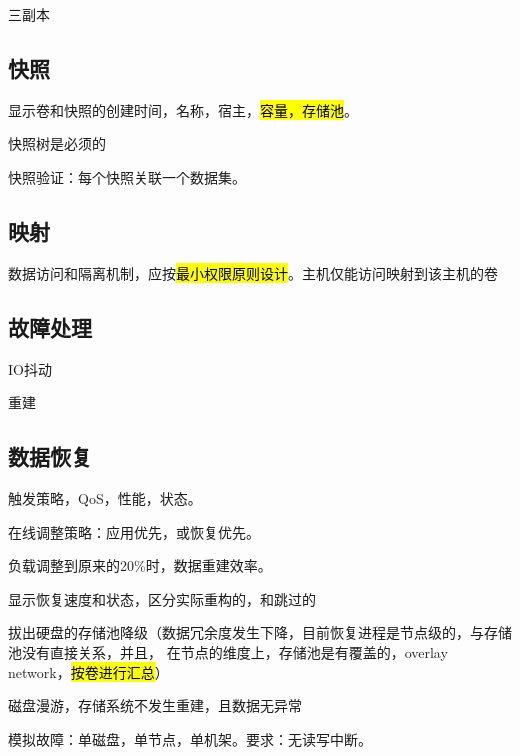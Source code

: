 三副本 

\subsection{快照}

\begin{enumbox}
    \item 显示卷和快照的创建时间，名称，宿主，\hl{容量，存储池}。
    \item 快照树是必须的
    \item 快照验证：每个快照关联一个数据集。
\end{enumbox}

\subsection{映射}

数据访问和隔离机制，应按\hl{最小权限原则设计}。主机仅能访问映射到该主机的卷

\subsection{故障处理}

\begin{enumbox}
    \item IO抖动
    \item 重建
\end{enumbox}

\subsection{数据恢复}

触发策略，QoS，性能，状态。

\begin{enumbox}
    \item 在线调整策略：应用优先，或恢复优先。
    \item 负载调整到原来的20\%时，数据重建效率。
    \item 显示恢复速度和状态，区分实际重构的，和跳过的
    \item 拔出硬盘的存储池降级（数据冗余度发生下降，目前恢复进程是节点级的，与存储池没有直接关系，并且，
        在节点的维度上，存储池是有覆盖的，overlay network，\hl{按卷进行汇总}）
    \item 磁盘漫游，存储系统不发生重建，且数据无异常
    \item 模拟故障：单磁盘，单节点，单机架。要求：无读写中断。
\end{enumbox}

